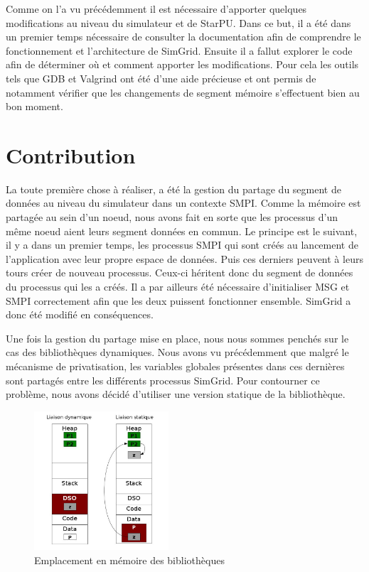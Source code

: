 \documentclass[smallextended]{svjour3}
\begin{document}
Comme on l'a vu précédemment il est nécessaire d'apporter quelques
modifications au niveau du simulateur et de StarPU. Dans ce but, il
a été dans un premier temps nécessaire de consulter la documentation
afin de comprendre le fonctionnement et l'architecture de
SimGrid. Ensuite il a fallut explorer le code afin de déterminer où
et comment apporter les modifications. Pour cela les outils tels que
GDB et Valgrind ont été d'une aide précieuse et ont permis de notamment
vérifier que les changements de segment mémoire s'effectuent bien au
bon moment.

\section{Contribution}
\label{sec-5}
La toute première chose à réaliser, a été la gestion du partage du
segment de données au niveau du simulateur dans un contexte
SMPI. Comme la mémoire est partagée au sein d'un noeud, nous avons
fait en sorte que les processus d'un même noeud aient leurs segment
données en commun. Le principe est le suivant, il y a dans un
premier temps, les processus SMPI qui sont créés au lancement de
l'application avec leur propre espace de données. Puis ces derniers
peuvent à leurs tours créer de nouveau processus. Ceux-ci héritent
donc du segment de données du processus qui les a créés. Il a par
ailleurs été nécessaire d'initialiser MSG et SMPI
correctement afin que les deux puissent fonctionner
ensemble. SimGrid a donc été modifié en conséquences. 

Une fois la gestion du partage mise en place, nous nous sommes
penchés sur le cas des bibliothèques dynamiques. Nous avons vu
précédemment que malgré le mécanisme de privatisation, les variables
globales présentes dans ces dernières sont partagés entre les
différents processus SimGrid. Pour contourner ce problème, nous
avons décidé d'utiliser une version statique de la bibliothèque.  

\begin{figure}[htb]
\centering
\includegraphics[width=5cm]{./Img/StaticDyn.jpg}
\caption{\label{fig:3}Emplacement en mémoire des bibliothèques}
\end{figure}
\end{document}
